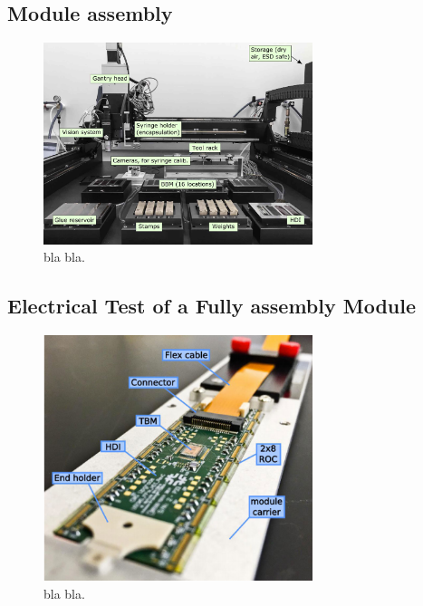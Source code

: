 \subsection{Module assembly}
\begin{figure}[!h]
  \centering
  \includegraphics[width=0.7\textwidth]{../images/ch7/gantry}
  \caption[bla for index.]{bla bla.}\label{fig:gantry}
\end{figure}



\subsection{Electrical Test of a Fully assembly Module}
\begin{figure}[!h]
  \centering
  \includegraphics[width=0.7\textwidth]{../images/ch7/fully_asem_mod}
  \caption[bla for index.]{bla bla.}\label{fig:fully_asem_mod}
\end{figure}







